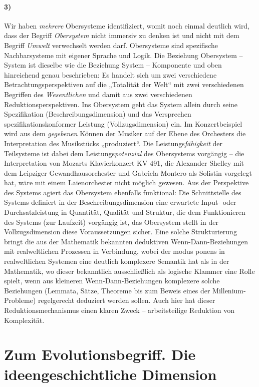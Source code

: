 \documentclass[11pt,a4paper]{article}
\begin{document}
\paragraph{3)}
Wir haben \emph{mehrere} Obersysteme identifiziert, womit noch einmal deutlich
wird, dass der Begriff \emph{Obersystem} nicht immersiv zu denken ist und
nicht mit dem Begriff \emph{Umwelt} verwechselt werden darf. Obersysteme sind
spezifische Nachbarsysteme mit eigener Sprache und Logik. Die Beziehung
Obersystem -- System ist dieselbe wie die Beziehung System -- Komponente und
oben hinreichend genau beschrieben: Es handelt sich um zwei verschiedene
Betrachtungsperspektiven auf die „Totalität der Welt“ mit zwei verschiedenen
Begriffen des \emph{Wesentlichen} und damit aus zwei verschiedenen
Reduktionsperspektiven. Ins Obersystem geht das System allein durch seine
Spezifikation (Beschreibungsdimension) und das Versprechen
spezifikationskonformer Leistung (Vollzugsdimension) ein. Im Konzertbeispiel
wird aus dem \emph{gegebenen} Können der Musiker auf der Ebene des Orchesters
die Interpretation des Musikstücks „produziert“.  Die
Leistungs\emph{fähigkeit} der Teilsysteme ist dabei dem
Leistungs\emph{potenzial} des Obersystems vorgängig -- die Interpretation von
Mozarts Klavierkonzert KV 491, die Alexander Shelley mit dem Leipziger
Gewandhausorchester und Gabriela Montero als Solistin vorgelegt hat, wäre mit
einem Laienorchester nicht möglich gewesen. Aus der Perspektive des Systems
agiert das Obersystem ebenfalls funktional: Die Schnittstelle des Systems
definiert in der Beschreibungsdimension eine erwartete Input- oder
Durchsatzleistung in Quantität, Qualität und Struktur, die dem Funktionieren
des Systems (zur Laufzeit) vorgängig ist, das Obersystem stellt in der
Vollzugsdimension diese Voraussetzungen sicher. Eine solche Strukturierung
bringt die aus der Mathematik bekannten deduktiven Wenn-Dann-Beziehungen mit
realweltlichen Prozessen in Verbindung, wobei der modus ponens in
realweltlichen Systemen eine deutlich komplexere Semantik hat als in der
Mathematik, wo dieser bekanntlich ausschließlich als logische Klammer eine
Rolle spielt, wenn aus kleineren Wenn-Dann-Beziehungen komplexere solche
Beziehungen (Lemmata, Sätze, Theoreme bis zum Beweis eines der
Millenium-Probleme) regelgerecht deduziert werden sollen.  Auch hier hat
dieser Reduktionsmechanismus einen klaren Zweck -- arbeitsteilige Reduktion
von Komplexität.

\section{Zum Evolutionsbegriff. Die ideengeschichtliche Dimension}
\end{document}
